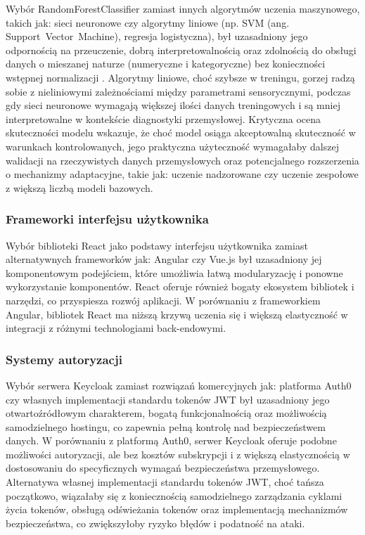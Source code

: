 Wybór \mbox{RandomForestClassifier} zamiast innych algorytmów uczenia maszynowego, takich jak: sieci neuronowe czy algorytmy liniowe (np. SVM (ang. \mbox{Support Vector Machine}), regresja logistyczna), był uzasadniony jego odpornością na przeuczenie, dobrą interpretowalnością oraz zdolnością do obsługi danych o mieszanej naturze (numeryczne i kategoryczne) bez konieczności wstępnej normalizacji \cite{spark_mllib_reference}. Algorytmy liniowe, choć szybsze w treningu, gorzej radzą sobie z nieliniowymi zależnościami między parametrami sensorycznymi, podczas gdy sieci neuronowe wymagają większej ilości danych treningowych i są mniej interpretowalne w kontekście diagnostyki przemysłowej.
\newpage
Krytyczna ocena skuteczności modelu wskazuje, że choć model osiąga akceptowalną skuteczność w warunkach kontrolowanych, jego praktyczna użyteczność wymagałaby dalszej walidacji na rzeczywistych danych przemysłowych oraz potencjalnego rozszerzenia o mechanizmy adaptacyjne, takie jak: uczenie nadzorowane czy uczenie zespołowe z większą liczbą modeli bazowych.

\subsubsection{Frameworki interfejsu użytkownika}

Wybór biblioteki React jako podstawy interfejsu użytkownika zamiast alternatywnych frameworków jak: \mbox{Angular} czy \mbox{Vue.js} był uzasadniony jej komponentowym podejściem, które umożliwia łatwą modularyzację i ponowne wykorzystanie komponentów. React oferuje również bogaty ekosystem bibliotek i narzędzi, co przyspiesza rozwój aplikacji. W porównaniu z frameworkiem \mbox{Angular}, bibliotek \mbox{React} ma niższą krzywą uczenia się i większą elastyczność w integracji z różnymi technologiami back-endowymi.

\subsubsection{Systemy autoryzacji}

Wybór serwera \mbox{Keycloak} \cite{keycloak_docs} zamiast rozwiązań komercyjnych jak: platforma \mbox{Auth0} czy własnych implementacji standardu tokenów JWT \cite{jwt_rfc} był uzasadniony jego otwartoźródłowym charakterem, bogatą funkcjonalnością oraz możliwością samodzielnego hostingu, co zapewnia pełną kontrolę nad bezpieczeństwem danych. W porównaniu z platformą \mbox{Auth0}, serwer \mbox{Keycloak} oferuje podobne możliwości autoryzacji, ale bez kosztów subskrypcji i z większą elastycznością w dostosowaniu do specyficznych wymagań bezpieczeństwa przemysłowego. Alternatywa własnej implementacji standardu tokenów JWT, choć tańsza początkowo, wiązałaby się z koniecznością samodzielnego zarządzania cyklami życia tokenów, obsługą odświeżania tokenów oraz implementacją mechanizmów bezpieczeństwa, co zwiększyłoby ryzyko błędów i podatność na ataki.

